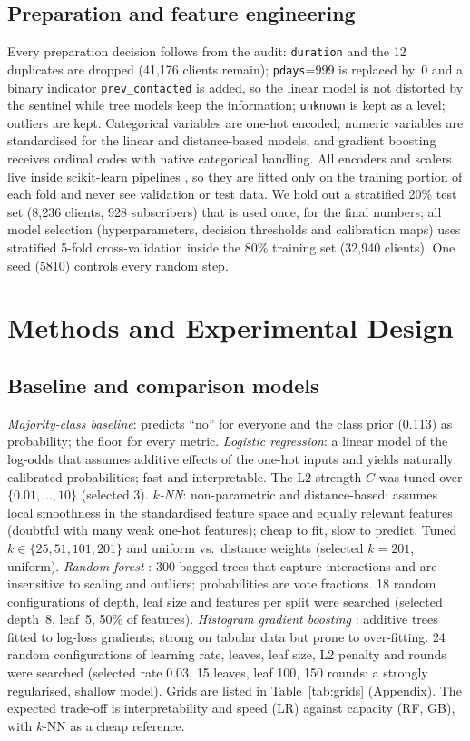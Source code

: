 \documentclass[conference]{IEEEtran}
\begin{document}
\subsection{Preparation and feature engineering}
Every preparation decision follows from the audit: \texttt{duration} and the 12 duplicates are dropped (41,176 clients remain); \texttt{pdays}=999 is replaced by~0 and a binary indicator \texttt{prev\_contacted} is added, so the linear model is not distorted by the sentinel while tree models keep the information; \texttt{unknown} is kept as a level; outliers are kept. Categorical variables are one-hot encoded; numeric variables are standardised for the linear and distance-based models, and gradient boosting receives ordinal codes with native categorical handling. All encoders and scalers live inside scikit-learn pipelines \cite{sklearn}, so they are fitted only on the training portion of each fold and never see validation or test data. We hold out a stratified 20\% test set (8,236 clients, 928 subscribers) that is used once, for the final numbers; all model selection (hyperparameters, decision thresholds and calibration maps) uses stratified 5-fold cross-validation inside the 80\% training set (32,940 clients). One seed (5810) controls every random step.

\section{Methods and Experimental Design}
\subsection{Baseline and comparison models}
\emph{Majority-class baseline}: predicts ``no'' for everyone and the class prior (0.113) as probability; the floor for every metric.
\emph{Logistic regression}: a linear model of the log-odds that assumes additive effects of the one-hot inputs and yields naturally calibrated probabilities; fast and interpretable. The L2 strength $C$ was tuned over $\{0.01,\dots,10\}$ (selected 3).
\emph{$k$-NN}: non-parametric and distance-based; assumes local smoothness in the standardised feature space and equally relevant features (doubtful with many weak one-hot features); cheap to fit, slow to predict. Tuned $k\in\{25,51,101,201\}$ and uniform vs.\ distance weights (selected $k=201$, uniform).
\emph{Random forest} \cite{breiman2001}: 300 bagged trees that capture interactions and are insensitive to scaling and outliers; probabilities are vote fractions. 18 random configurations of depth, leaf size and features per split were searched (selected depth~8, leaf~5, 50\% of features).
\emph{Histogram gradient boosting} \cite{friedman2001,ke2017}: additive trees fitted to log-loss gradients; strong on tabular data but prone to over-fitting. 24 random configurations of learning rate, leaves, leaf size, L2 penalty and rounds were searched (selected rate 0.03, 15 leaves, leaf 100, 150 rounds: a strongly regularised, shallow model). Grids are listed in Table~\ref{tab:grids} (Appendix). The expected trade-off is interpretability and speed (LR) against capacity (RF, GB), with $k$-NN as a cheap reference.
\end{document}
